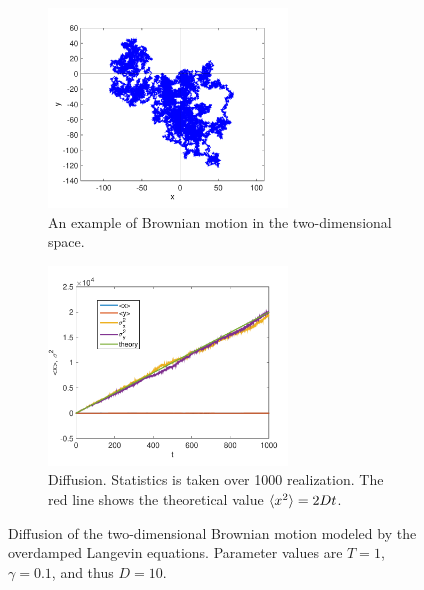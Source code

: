 \begin{figure}
	\centering
	\begin{subfigure}{0.45\textwidth}
		\centering
		\includegraphics[width=2.5in]{18.Langevin/2d_langevin_traject.pdf}
		\caption{An example of Brownian motion in the two-dimensional space.}
		\label{fig:2d_od_traj}
	\end{subfigure}
	\begin{subfigure}{0.45\textwidth}
		\centering
		\includegraphics[width=2.5in]{18.Langevin/2d_langevin_diffusion.pdf}
		\caption{Diffusion. Statistics is taken over 1000 realization. The red line shows the theoretical value $\langle x^2 \rangle = 2 D t$.}
		\label{fig:2d_od_diff}
	\end{subfigure}
\caption{Diffusion of the two-dimensional Brownian motion modeled by the overdamped Langevin equations. Parameter values are $T=1$, $\gamma=0.1$, and thus $D=10$.}
\end{figure}

